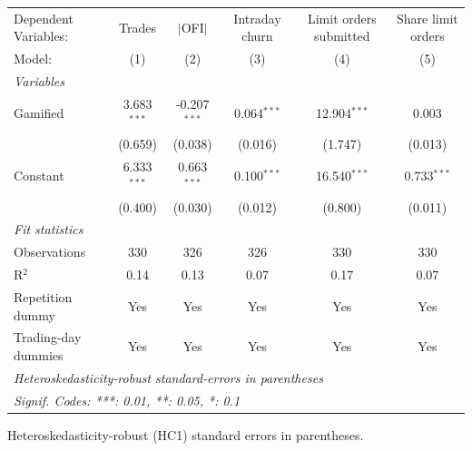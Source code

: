 \begingroup
\centering
\begin{tabular}{lccccc}
   \tabularnewline \midrule \midrule
   Dependent Variables: & Trades        & $|$OFI$|$      & Intraday churn & Limit orders submitted & Share limit orders\\  
   Model:               & (1)           & (2)            & (3)            & (4)                    & (5)\\  
   \midrule
   \emph{Variables}\\
   Gamified             & 3.683$^{***}$ & -0.207$^{***}$ & 0.064$^{***}$  & 12.904$^{***}$         & 0.003\\   
                        & (0.659)       & (0.038)        & (0.016)        & (1.747)                & (0.013)\\   
   Constant             & 6.333$^{***}$ & 0.663$^{***}$  & 0.100$^{***}$  & 16.540$^{***}$         & 0.733$^{***}$\\   
                        & (0.400)       & (0.030)        & (0.012)        & (0.800)                & (0.011)\\   
   \midrule
   \emph{Fit statistics}\\
   Observations         & 330           & 326            & 326            & 330                    & 330\\  
   R$^2$                & 0.14          & 0.13           & 0.07           & 0.17                   & 0.07\\  
   Repetition dummy     & Yes           & Yes            & Yes            & Yes                    & Yes\\  
   Trading-day dummies  & Yes           & Yes            & Yes            & Yes                    & Yes\\  
   \midrule \midrule
   \multicolumn{6}{l}{\emph{Heteroskedasticity-robust standard-errors in parentheses}}\\
   \multicolumn{6}{l}{\emph{Signif. Codes: ***: 0.01, **: 0.05, *: 0.1}}\\
\end{tabular}
 
\par \raggedright 
Heteroskedasticity-robust (HC1) standard errors in parentheses.
\par\endgroup
